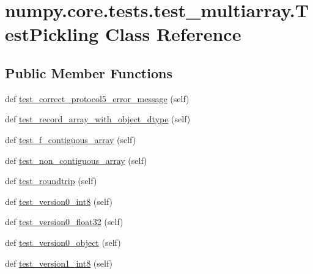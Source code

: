 \hypertarget{classnumpy_1_1core_1_1tests_1_1test__multiarray_1_1TestPickling}{}\section{numpy.\+core.\+tests.\+test\+\_\+multiarray.\+Test\+Pickling Class Reference}
\label{classnumpy_1_1core_1_1tests_1_1test__multiarray_1_1TestPickling}
\subsection*{Public Member Functions}
\begin{DoxyCompactItemize}
\item 
def \hyperlink{classnumpy_1_1core_1_1tests_1_1test__multiarray_1_1TestPickling_a5d532f8e5c05c731dc448648e3728b8d}{test\+\_\+correct\+\_\+protocol5\+\_\+error\+\_\+message} (self)
\item 
def \hyperlink{classnumpy_1_1core_1_1tests_1_1test__multiarray_1_1TestPickling_a7c677c32e2b7fa3fae2f9eee619e40e3}{test\+\_\+record\+\_\+array\+\_\+with\+\_\+object\+\_\+dtype} (self)
\item 
def \hyperlink{classnumpy_1_1core_1_1tests_1_1test__multiarray_1_1TestPickling_a9f6dcbbb8ed91f5e04e8d19f57f241fa}{test\+\_\+f\+\_\+contiguous\+\_\+array} (self)
\item 
def \hyperlink{classnumpy_1_1core_1_1tests_1_1test__multiarray_1_1TestPickling_adfd814b0afb9053fad055b0a7c23ef75}{test\+\_\+non\+\_\+contiguous\+\_\+array} (self)
\item 
def \hyperlink{classnumpy_1_1core_1_1tests_1_1test__multiarray_1_1TestPickling_abaddca41fec2beb8710c3c48d5459b41}{test\+\_\+roundtrip} (self)
\item 
def \hyperlink{classnumpy_1_1core_1_1tests_1_1test__multiarray_1_1TestPickling_a0ebd3b4410dab642a933a3777c91999b}{test\+\_\+version0\+\_\+int8} (self)
\item 
def \hyperlink{classnumpy_1_1core_1_1tests_1_1test__multiarray_1_1TestPickling_a61e71fdc78cf4e6441f6fd5901903efd}{test\+\_\+version0\+\_\+float32} (self)
\item 
def \hyperlink{classnumpy_1_1core_1_1tests_1_1test__multiarray_1_1TestPickling_a1f5bc09bb3d6088e8e2286209c2605dd}{test\+\_\+version0\+\_\+object} (self)
\item 
def \hyperlink{classnumpy_1_1core_1_1tests_1_1test__multiarray_1_1TestPickling_a72140b00f0bfb004dc0577d523269270}{test\+\_\+version1\+\_\+int8} (self)

\end{DoxyCompactItemize}
